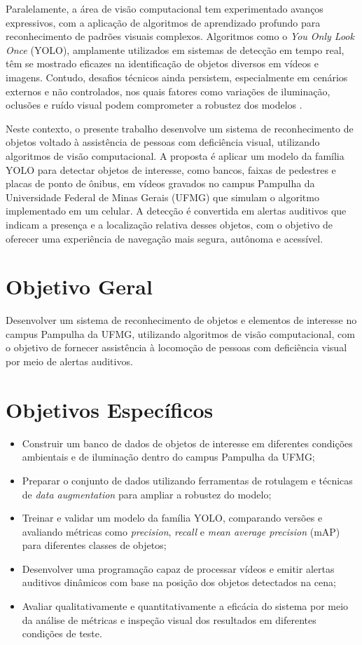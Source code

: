 Paralelamente, a área de visão computacional tem experimentado avanços expressivos, com a aplicação de algoritmos de aprendizado profundo para reconhecimento de padrões visuais complexos. Algoritmos como o \textit{You Only Look Once} (YOLO), amplamente utilizados em sistemas de detecção em tempo real, têm se mostrado eficazes na identificação de objetos diversos em vídeos e imagens. Contudo, desafios técnicos ainda persistem, especialmente em cenários externos e não controlados, nos quais fatores como variações de iluminação, oclusões e ruído visual podem comprometer a robustez dos modelos \cite{gautam2021}.

Neste contexto, o presente trabalho desenvolve um sistema de reconhecimento de objetos voltado à assistência de pessoas com deficiência visual, utilizando algoritmos de visão computacional. A proposta é aplicar um modelo da família YOLO para detectar objetos de interesse, como bancos, faixas de pedestres e placas de ponto de ônibus, em vídeos gravados no campus Pampulha da Universidade Federal de Minas Gerais (UFMG) que simulam o algoritmo implementado em um celular. A detecção é convertida em alertas auditivos que indicam a presença e a localização relativa desses objetos, com o objetivo de oferecer uma experiência de navegação mais segura, autônoma e acessível.

\section{Objetivo Geral}

Desenvolver um sistema de reconhecimento de objetos e elementos de interesse no campus Pampulha da UFMG, utilizando algoritmos de visão computacional, com o objetivo de fornecer assistência à locomoção de pessoas com deficiência visual por meio de alertas auditivos.

\section{Objetivos Específicos}

\begin{itemize}
\item	Construir um banco de dados de objetos de interesse em diferentes condições ambientais e de iluminação dentro do campus Pampulha da UFMG;
\item	Preparar o conjunto de dados utilizando ferramentas de rotulagem e técnicas de \textit{data augmentation} para ampliar a robustez do modelo;
\item	Treinar e validar um modelo da família YOLO, comparando versões e avaliando métricas como \textit{precision}, \textit{recall} e \textit{mean average precision} (mAP) para diferentes classes de objetos;
\item	Desenvolver uma programação capaz de processar vídeos e emitir alertas auditivos dinâmicos com base na posição dos objetos detectados na cena;
\item   Avaliar qualitativamente e quantitativamente a eficácia do sistema por meio da análise de métricas e inspeção visual dos resultados em diferentes condições de teste.

\end{itemize}
